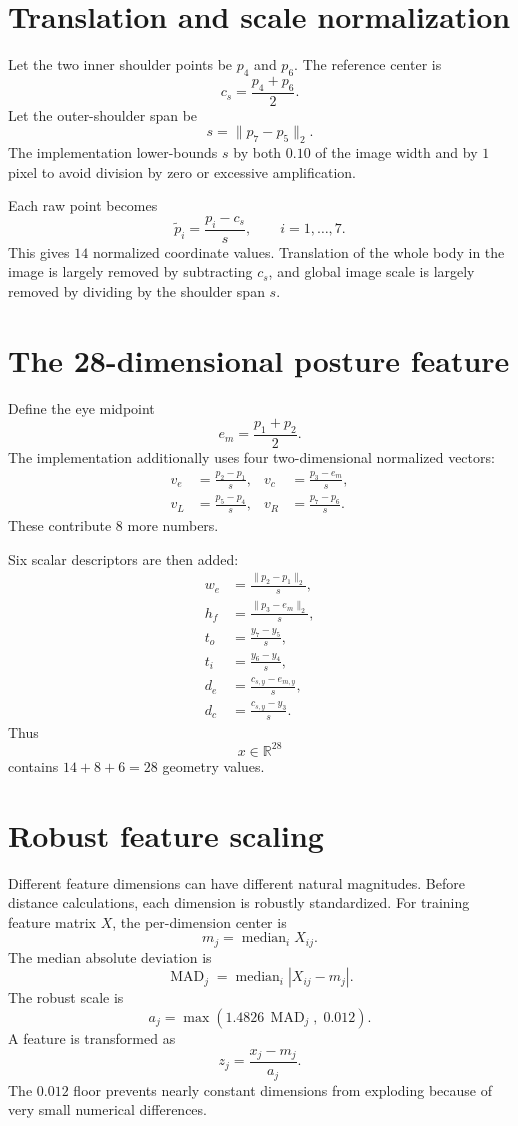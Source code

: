 \documentclass[11pt,a4paper]{article}
\begin{document}
\section{Translation and scale normalization}

Let the two inner shoulder points be $p_4$ and $p_6$. The reference center is
\[
c_s = \frac{p_4+p_6}{2}.
\]
Let the outer-shoulder span be
\[
s = \lVert p_7-p_5\rVert_2.
\]
The implementation lower-bounds $s$ by both $0.10$ of the image width and by
$1$ pixel to avoid division by zero or excessive amplification.

Each raw point becomes
\[
\tilde p_i = \frac{p_i-c_s}{s}, \qquad i=1,\ldots,7.
\]
This gives $14$ normalized coordinate values. Translation of the whole body in
the image is largely removed by subtracting $c_s$, and global image scale is
largely removed by dividing by the shoulder span $s$.

\section{The 28-dimensional posture feature}

Define the eye midpoint
\[
e_m=\frac{p_1+p_2}{2}.
\]
The implementation additionally uses four two-dimensional normalized vectors:
\begin{align*}
v_e &= \frac{p_2-p_1}{s}, &
 v_c &= \frac{p_3-e_m}{s},\\
v_L &= \frac{p_5-p_4}{s}, &
 v_R &= \frac{p_7-p_6}{s}.
\end{align*}
These contribute $8$ more numbers.

Six scalar descriptors are then added:
\begin{align*}
w_e &= \frac{\lVert p_2-p_1\rVert_2}{s},\\
h_f &= \frac{\lVert p_3-e_m\rVert_2}{s},\\
t_o &= \frac{y_7-y_5}{s},\\
t_i &= \frac{y_6-y_4}{s},\\
d_e &= \frac{c_{s,y}-e_{m,y}}{s},\\
d_c &= \frac{c_{s,y}-y_3}{s}.
\end{align*}
Thus
\[
x\in\mathbb{R}^{28}
\]
contains $14+8+6=28$ geometry values.

\section{Robust feature scaling}

Different feature dimensions can have different natural magnitudes. Before
distance calculations, each dimension is robustly standardized. For training
feature matrix $X$, the per-dimension center is
\[
m_j=\operatorname{median}_i X_{ij}.
\]
The median absolute deviation is
\[
\operatorname{MAD}_j=
\operatorname{median}_i\left|X_{ij}-m_j\right|.
\]
The robust scale is
\[
a_j=\max\left(1.4826\,\operatorname{MAD}_j,\;0.012\right).
\]
A feature is transformed as
\[
z_j=\frac{x_j-m_j}{a_j}.
\]
The $0.012$ floor prevents nearly constant dimensions from exploding because of
very small numerical differences.
\end{document}
